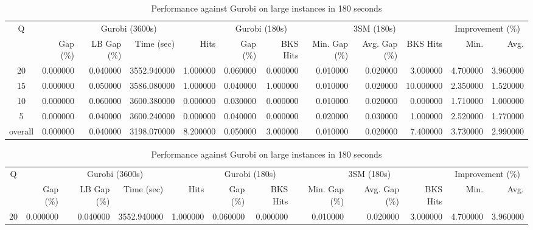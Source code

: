 \begin{table}[H]
\caption{Performance against Gurobi on large instances in 180 seconds}
\label{tab:3lm_resuts200T180}
\begin{tabular}{c rrrr rr rrr rr}
\toprule
Q & \multicolumn{4}{c}{Gurobi (3600s)} & \multicolumn{2}{c}{Gurobi (180s)} & \multicolumn{3}{c}{3SM (180s)} & \multicolumn{2}{c}{Improvement (\%)} \\
 & Gap (\%) & LB Gap (\%) & Time (sec) & Hits & Gap (\%) & BKS Hits & Min. Gap (\%) & Avg. Gap (\%) & BKS Hits & Min. & Avg. \\
\midrule
\cmidrule(lr){1-1} \cmidrule(lr){2-5} \cmidrule(lr){2-5} \cmidrule(lr){6-7} \cmidrule(lr){8-10} \cmidrule(lr){11-12}
20 & 0.000000 & 0.040000 & 3552.940000 & 1.000000 & 0.060000 & 0.000000 & 0.010000 & 0.020000 & 3.000000 & 4.700000 & 3.960000 \\
15 & 0.000000 & 0.050000 & 3586.080000 & 1.000000 & 0.040000 & 1.000000 & 0.010000 & 0.020000 & 10.000000 & 2.350000 & 1.520000 \\
10 & 0.000000 & 0.060000 & 3600.380000 & 0.000000 & 0.030000 & 0.000000 & 0.010000 & 0.020000 & 0.000000 & 1.710000 & 1.000000 \\
5 & 0.000000 & 0.040000 & 3600.240000 & 0.000000 & 0.040000 & 0.000000 & 0.020000 & 0.030000 & 1.000000 & 2.520000 & 1.770000 \\
\midrule
overall & 0.000000 & 0.040000 & 3198.070000 & 8.200000 & 0.050000 & 3.000000 & 0.010000 & 0.020000 & 7.400000 & 3.730000 & 2.990000 \\
\bottomrule
\end{tabular}
\end{table}\begin{table}[H]
\caption{Performance against Gurobi on large instances in 180 seconds}
\label{tab:3lm_resuts200T180}
\begin{tabular}{c rrrr rr rrr rr}
\toprule
Q & \multicolumn{4}{c}{Gurobi (3600s)} & \multicolumn{2}{c}{Gurobi (180s)} & \multicolumn{3}{c}{3SM (180s)} & \multicolumn{2}{c}{Improvement (\%)} \\
 & Gap (\%) & LB Gap (\%) & Time (sec) & Hits & Gap (\%) & BKS Hits & Min. Gap (\%) & Avg. Gap (\%) & BKS Hits & Min. & Avg. \\
\midrule
\cmidrule(lr){1-1} \cmidrule(lr){2-5} \cmidrule(lr){2-5} \cmidrule(lr){6-7} \cmidrule(lr){8-10} \cmidrule(lr){11-12}
20 & 0.000000 & 0.040000 & 3552.940000 & 1.000000 & 0.060000 & 0.000000 & 0.010000 & 0.020000 & 3.000000 & 4.700000 & 3.960000 \\

\end{tabular}
\end{table}
